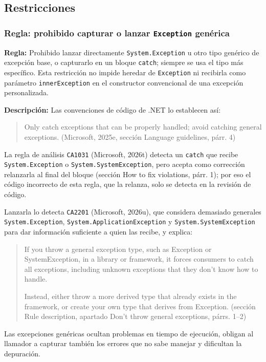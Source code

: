 \subsection{Restricciones}

\subsubsection{Regla: prohibido capturar o lanzar \texttt{Exception} genérica}

\textbf{Regla:} Prohibido lanzar directamente \texttt{System.Exception} u otro tipo genérico de excepción base, o capturarlo en un bloque \texttt{catch}; siempre se usa el tipo más específico. Esta restricción no impide heredar de \texttt{Exception} ni recibirla como parámetro \texttt{innerException} en el constructor convencional de una excepción personalizada.

\textbf{Descripción:} Las convenciones de código de .NET lo establecen así:
\begin{quote}
Only catch exceptions that can be properly handled; avoid catching general exceptions. (Microsoft, 2025e, sección Language guidelines, párr. 4)
\end{quote}
\noindent La regla de análisis \texttt{CA1031} (Microsoft, 2026t) detecta un \texttt{catch} que recibe \texttt{System.Exception} o \texttt{System.SystemException}, pero acepta como corrección relanzarla al final del bloque (sección How to fix violations, párr. 1); por eso el código incorrecto de esta regla, que la relanza, solo se detecta en la revisión de código.

\noindent Lanzarla lo detecta \texttt{CA2201} (Microsoft, 2026u), que considera demasiado generales \texttt{System.Exception}, \texttt{System.ApplicationException} y \texttt{System.SystemException} para dar información suficiente a quien las recibe, y explica:
\begin{quote}
If you throw a general exception type, such as Exception or SystemException, in a library or framework, it forces consumers to catch all exceptions, including unknown exceptions that they don't know how to handle.

Instead, either throw a more derived type that already exists in the framework, or create your own type that derives from Exception. (sección Rule description, apartado Don't throw general exceptions, párrs. 1--2)
\end{quote}
\noindent Las excepciones genéricas ocultan problemas en tiempo de ejecución, obligan al llamador a capturar también los errores que no sabe manejar y dificultan la depuración.

